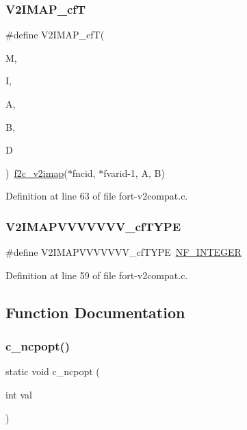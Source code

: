 \subsubsection{\texorpdfstring{V2\+I\+M\+A\+P\+\_\+cfT}{V2IMAP\_cfT}}
{\footnotesize\ttfamily \#define V2\+I\+M\+A\+P\+\_\+cfT(\begin{DoxyParamCaption}\item[{}]{M,  }\item[{}]{I,  }\item[{}]{A,  }\item[{}]{B,  }\item[{}]{D }\end{DoxyParamCaption})~\hyperlink{nf__v2compat_8c_a75a49e271d39db2186743d5deef88f7a}{f2c\+\_\+v2imap}($\ast$fncid, $\ast$fvarid-\/1, A, B)}



Definition at line 63 of file fort-\/v2compat.\+c.

\mbox{\label{fort-v2compat_8c_ac0311e2d4d244d1b662101115c69e3f5}} 
\subsubsection{\texorpdfstring{V2\+I\+M\+A\+P\+V\+V\+V\+V\+V\+V\+V\+\_\+cf\+T\+Y\+PE}{V2IMAPVVVVVVV\_cfTYPE}}
{\footnotesize\ttfamily \#define V2\+I\+M\+A\+P\+V\+V\+V\+V\+V\+V\+V\+\_\+cf\+T\+Y\+PE~\hyperlink{ncfortran_8h_a0fd3f9e9fc30661142a1fb549af678e7}{N\+F\+\_\+\+I\+N\+T\+E\+G\+ER}}



Definition at line 59 of file fort-\/v2compat.\+c.



\subsection{Function Documentation}
\mbox{\label{fort-v2compat_8c_ab008e5bfc98a80ca25189628e76e3ebf}} 
\subsubsection{\texorpdfstring{c\+\_\+ncpopt()}{c\_ncpopt()}}
{\footnotesize\ttfamily static void c\+\_\+ncpopt (\begin{DoxyParamCaption}\item[{int}]{val }\end{DoxyParamCaption})\hspace{0.3cm}{\ttfamily [static]}}



